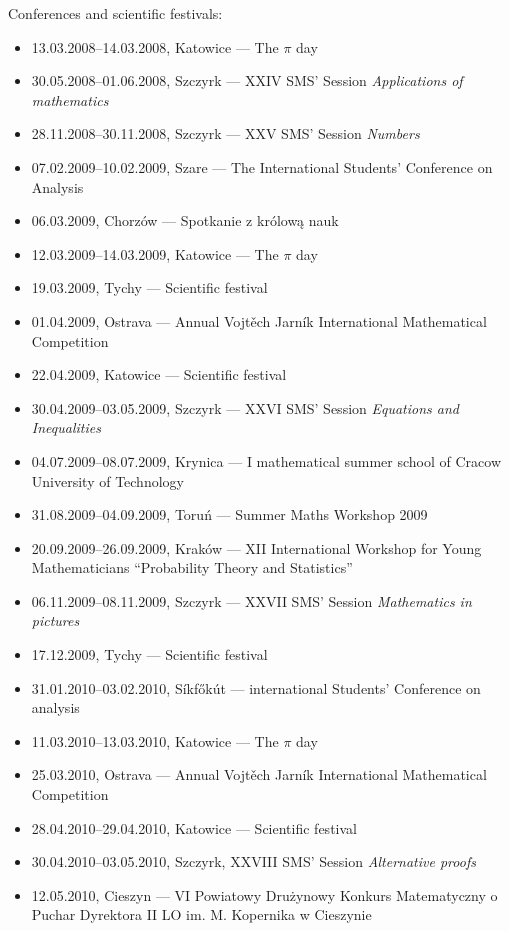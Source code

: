 \noindent Conferences and scientific festivals:
\begin{itemize}
  \item 13.03.2008--14.03.2008, Katowice --- The $\pi$ day
  \item 30.05.2008--01.06.2008, Szczyrk --- XXIV SMS' Session \textsl{Applications of mathematics}
  \item 28.11.2008--30.11.2008, Szczyrk --- XXV SMS' Session \textsl{Numbers}
  \item 07.02.2009--10.02.2009, Szare --- The  International Students' Conference on Analysis
  \item 06.03.2009, Chorzów --- Spotkanie z królową nauk
  \item 12.03.2009--14.03.2009, Katowice --- The $\pi$ day
  \item 19.03.2009, Tychy --- Scientific festival
  \item 01.04.2009, Ostrava ---  Annual Vojtěch Jarník International Mathematical Competition
  \item 22.04.2009, Katowice --- Scientific festival
  \item 30.04.2009--03.05.2009, Szczyrk --- XXVI SMS' Session \textsl{Equations and Inequalities}
  \item 04.07.2009--08.07.2009, Krynica --- I mathematical summer school of Cracow University of Technology
  \item 31.08.2009--04.09.2009, Toruń --- Summer Maths Workshop 2009
  \item 20.09.2009--26.09.2009, Kraków --- XII International Workshop for Young Mathematicians ``Probability Theory and Statistics''
  \item 06.11.2009--08.11.2009, Szczyrk --- XXVII SMS' Session \textsl{Mathematics in pictures}
  \item 17.12.2009, Tychy --- Scientific festival
  \item 31.01.2010--03.02.2010, Síkfőkút ---  international Students' Conference on analysis
  \item 11.03.2010--13.03.2010, Katowice --- The $\pi$ day
  \item 25.03.2010, Ostrava ---  Annual Vojtěch Jarník International Mathematical Competition
  \item 28.04.2010--29.04.2010, Katowice --- Scientific festival
  \item 30.04.2010--03.05.2010, Szczyrk, XXVIII SMS' Session \textsl{Alternative proofs}
  \item 12.05.2010, Cieszyn --- VI Powiatowy Drużynowy Konkurs Matematyczny o Puchar Dyrektora II LO im. M. Kopernika w Cieszynie

\end{itemize}
